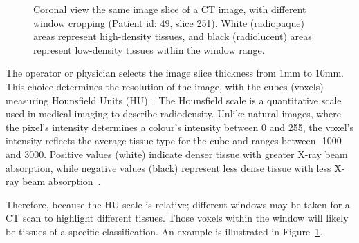 \documentclass[11pt,twoside]{report}
\begin{document}
\begin{figure}[H]
    \centering
    \caption{Coronal view the same image slice of a CT image, with different window cropping (Patient id: 49, slice 251). White (radiopaque) areas represent high-density tissues, and black (radiolucent) areas represent low-density tissues within the window range.}\label{fig:ct-windows}
\end{figure}

The operator or physician selects the image slice thickness from 1mm to 10mm. This choice determines the resolution of the image, with the cubes (voxels) measuring Hounsfield Units (HU)~\cite{diagnostic-radiology-physics}. The Hounsfield scale is a quantitative scale used in medical imaging to describe radiodensity. Unlike natural images, where the pixel's intensity determines a colour's intensity between 0 and 255, the voxel's intensity reflects the average tissue type for the cube and ranges between -1000 and 3000. Positive values (white) indicate denser tissue with greater X-ray beam absorption, while negative values (black) represent less dense tissue with less X-ray beam absorption~\cite{Statpearls}.

Therefore, because the HU scale is relative; different windows may be taken for a CT scan to highlight different tissues. Those voxels within the window will likely be tissues of a specific classification. An example is illustrated in Figure~\ref{fig:ct-windows}.
\end{document}
